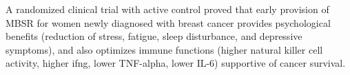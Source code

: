 \documentclass[jpm,article,submit,moreauthors,pdftex]{Definitions/mdpi}
\begin{document}
\begin{paracol}{2}
A randomized clinical trial with active control proved that early provision of MBSR for women newly diagnosed with breast cancer provides psychological benefits (reduction of stress, fatigue, sleep disturbance, and depressive symptoms), and also optimizes immune functions (higher natural killer cell activity, higher \acrshort{ifng}, lower TNF-alpha, lower IL-6) supportive of cancer survival\cite{WitekJanusek2019}.




\end{paracol}
\end{document}
